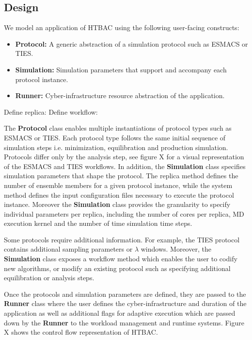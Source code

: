 \subsection{Design}

We model an application of HTBAC using the following user-facing constructs:

\begin{itemize}
  \item \textbf{Protocol:} A generic abstraction of a simulation protocol such
  as ESMACS or TIES. 
  \item \textbf{Simulation:} Simulation parameters that support and accompany 
  each protocol instance. 
  \item \textbf{Runner:} Cyber-infrastructure resource abstraction of the 
  application. 
\end{itemize}


Define replica: 
Define workflow: 

The \textbf{Protocol} class enables multiple instantiations of protocol types
such as ESMACS or TIES. Each protocol type follows the same initial sequence of 
simulation steps i.e. minimization, equilibration and production simulation.  
Protocols differ only by the analysis step, see figure X for 
a visual representation of the ESMACS and TIES workflows. In addition, the 
\textbf{Simulation} class specifies simulation parameters that shape the 
protocol. The replica method defines the number of ensemble members for a 
given protocol instance, while the system method defines the input
configuration files necessary to execute the protocol instance. Moreover the 
\textbf{Simulation} class provides the granularity to specify individual 
parameters per replica, including the number of cores per replica, MD execution 
kernel and the number of time simulation time steps.

Some protocols require additional information. For 
example, the TIES protocol contains additional sampling parameters or   
$\lambda$ windows. Moreover, the \textbf{Simulation} class exposes a 
workflow method which enables the user to codify new algorithms, or modify
an existing protocol such as specifying additional equilibration or analysis 
steps. 

Once the protocols and simulation parameters 
are defined, they are passed to the \textbf{Runner} class where the user defines 
the cyber-infrastructure and duration of the application as well as additional 
flags for adaptive execution which are passed down by the \textbf{Runner} to the 
workload management and runtime systems. Figure X shows the control flow 
representation of HTBAC. 


